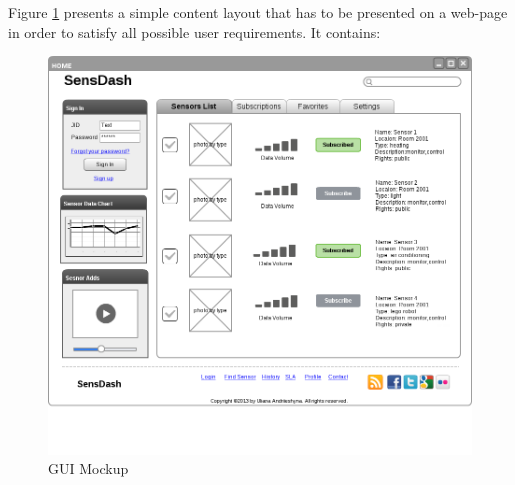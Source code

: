   Figure \ref{img:GUI Mockup} presents a simple content layout that has to be presented on a web-page in order to satisfy all possible user requirements. It contains:

    \begin{figure}[!ht]
    \centering
    \includegraphics[scale=0.5]{images/Mockup.png}   
    \caption[GUI Mockup]{GUI Mockup}
    \label{img:GUI Mockup}                           
    \end{figure}

